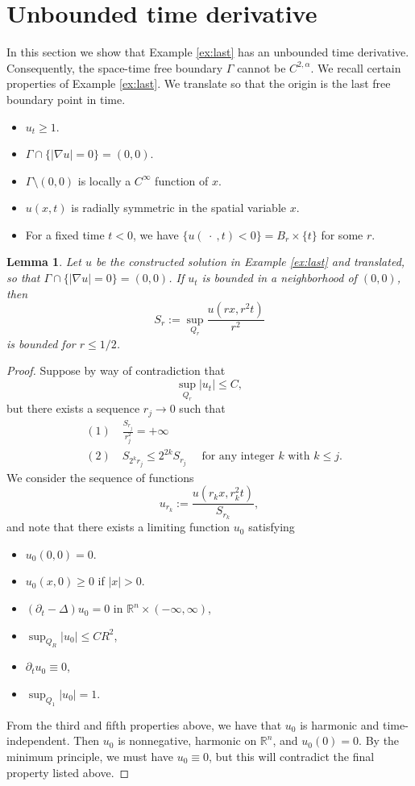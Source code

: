 \documentclass{amsart}
\newtheorem{lemma}[theorem]{Lemma}
\numberwithin{equation}{section}
\begin{document}
\section{Unbounded time derivative} \label{s:unbound}
In this section we show that Example \ref{ex:last} has an unbounded time derivative. Consequently, the space-time free boundary $\Gamma$ cannot be $C^{2,\alpha}$. We recall certain properties of Example \ref{ex:last}. We translate so that the origin is the last free boundary point in time. 
\begin{itemize}
    \item $u_t \geq 1$. 
    \item $\Gamma \cap \{|\nabla u|=0\}=(0,0)$. 
    \item $\Gamma \setminus (0,0)$ is locally a $C^{\infty}$ function of $x$. 
    \item $u(x,t)$ is radially symmetric in the spatial variable $x$. 
    \item For a fixed time $t<0$, we have $\{u(\ \cdot\ ,t)<0\}=B_r \times \{t\}$ for some $r$. 
\end{itemize}

\begin{lemma} \label{l:growth}
 Let $u$ be the constructed solution in Example \ref{ex:last} and translated, so that $\Gamma \cap \{|\nabla u|=0\}=(0,0)$. If $u_t$ is bounded in a neighborhood of $(0,0)$, then 
 \[
 S_r:= \sup_{Q_r} \frac{u(rx,r^2t)}{r^2}
 \]
 is bounded for $r\leq 1/2$. 
\end{lemma}

\begin{proof}
    Suppose by way of contradiction that 
    \[
     \sup_{Q_r} |u_t| \leq C,
    \]
     but there exists a sequence $r_j \to 0$ such that 
    \[
    \begin{aligned}
      &(1) \quad \frac{S_{r_j}}{r_j^2} =+\infty \\
      &(2) \quad S_{2^kr_j} \leq 2^{2k} S_{r_j}\quad \text{ for any integer $k$ with } k\leq j.  
    \end{aligned}
    \]
    We consider the sequence of functions 
    \[
    u_{r_k}:= \frac{u(r_kx, r_k^2 t)}{S_{r_k}},
    \]
    and note that there exists a limiting function $u_0$ satisfying 
    \begin{itemize}
     \item $u_0(0,0)=0$.
     \item $u_0(x,0)\geq 0$ if $|x|>0$. 
     \item $(\partial_t-\Delta) u_0 =0$ in $\mathbb{R}^n \times (-\infty,\infty)$,
     \item $\sup_{Q_R} |u_0| \leq C R^2$,
     \item $\partial_t u_0 \equiv 0$,
     \item $\sup_{Q_1} |u_0|=1$. 
    \end{itemize}
    From the third and fifth properties above, we have that $u_0$ is harmonic and time-independent. Then $u_0$ is nonnegative, harmonic on $\mathbb{R}^n$,   and $u_0(0)=0$. By the minimum principle,  we must have $u_0 \equiv 0$, but this will contradict the final property listed above. 
\end{proof}
\end{document}
